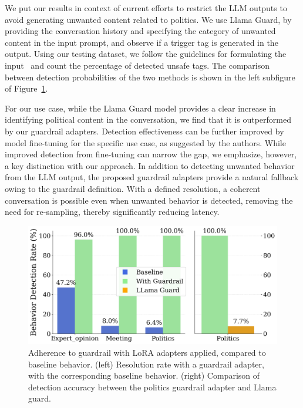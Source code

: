 \documentclass[letterpaper]{article}
\begin{document}
We put our results in context of current efforts to restrict the LLM outputs to avoid generating unwanted content related to politics. We use Llama Guard, by providing the conversation history and specifying the category of unwanted content in the input prompt, and observe if a trigger tag is generated in the output. Using our testing dataset, we follow the guidelines for formulating the input~\cite{llama_format} and count the percentage of detected unsafe tags. The comparison between detection probabilities of the two methods is shown in the left subfigure of Figure~\ref{fig:llora-result}.

For our use case, while the Llama Guard model provides a clear increase in identifying political content in the conversation, we find that it is outperformed by our guardrail adapters.
Detection effectiveness can be further improved by model fine-tuning for the specific use case, as suggested by the authors. While improved detection from fine-tuning can narrow the gap, we emphasize, however, a key distinction with our approach. In addition to detecting unwanted behavior from the LLM output, the proposed guardrail adapters provide a natural fallback owing to the guardrail definition. With a defined resolution, a coherent conversation is possible even when unwanted behavior is detected, removing the need for re-sampling, thereby significantly reducing latency.

\begin{figure}[h!]
	\centering
	\includegraphics[width=1.0\linewidth]{figures/detection_efficiency_single.png}
	\caption{Adherence to guardrail with LoRA adapters applied, compared to baseline behavior. 
		(left)  Resolution rate with a guardrail adapter, with the corresponding baseline behavior. 
		(right)  Comparison of detection accuracy between the politics guardrail adapter and Llama guard.}\label{fig:llora-result}
\end{figure}
\end{document}
